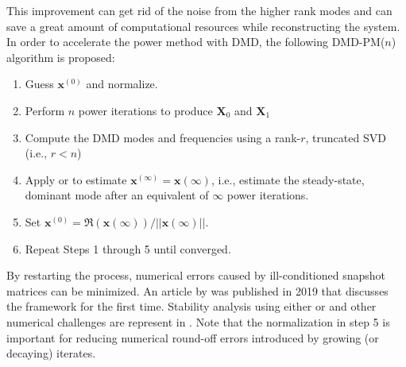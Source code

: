 This improvement can get rid of the noise from the higher rank modes and can save a great amount of computational resources while reconstructing the system.
In order to accelerate the power method with DMD, the following DMD-PM($n$) algorithm is proposed:
\begin{enumerate}
 \item Guess $\mathbf{x}^{(0)}$ and normalize.
 \item Perform $n$ power iterations to produce $\mathbf{X}_0$ and $\mathbf{X}_1$
 \item Compute the DMD modes and frequencies using a rank-$r$, truncated  SVD (i.e., $r < n$)
 \item Apply  or  to estimate $\mathbf{x}^{(\infty)}=\mathbf{x}(\infty)$, i.e., estimate the steady-state, dominant mode after an equivalent of $\infty$ power iterations.
 \item Set $\mathbf{x}^{(0)} = \Re(\mathbf{x}(\infty)) / ||\mathbf{x}(\infty)||$.  
 \item Repeat Steps 1 through 5 until converged.
\end{enumerate}
By restarting the process, numerical errors caused by ill-conditioned snapshot matrices can be minimized.
An article by \citet{roberts2019acceleration} was published in 2019 that discusses the framework for the first time.
Stability analysis using either  or  and other numerical challenges are represent in .
Note that the normalization in step 5 is important for reducing numerical round-off errors introduced by growing (or decaying) iterates.

